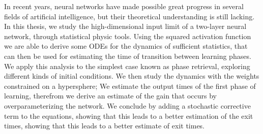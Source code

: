 In recent years, neural networks have made possible great progress in several fields of artificial intelligence,
but their theoretical understanding is still lacking.
In this thesis, we study the high-dimensional input limit of a two-layer neural network,
through statistical physic tools.
Using the squared activation function we are able to derive some ODEs for the dynamics of sufficient statistics,
that can then be used for estimating the time of transition between learning phases.
We apply this analysis to the simplest case known as phase retrieval, exploring different kinds of initial conditions.
We then study the dynamics with the weights constrained on a hypersphere;
We estimate the output times of the first phase of learning, therefrom we derive an estimate of the gain that occurs by overparameterizing the network.
We conclude by adding a stochastic corrective term to the equations,
showing that this leads to a better estimation of the exit times, showing that this leads to a better estimate of exit times.
